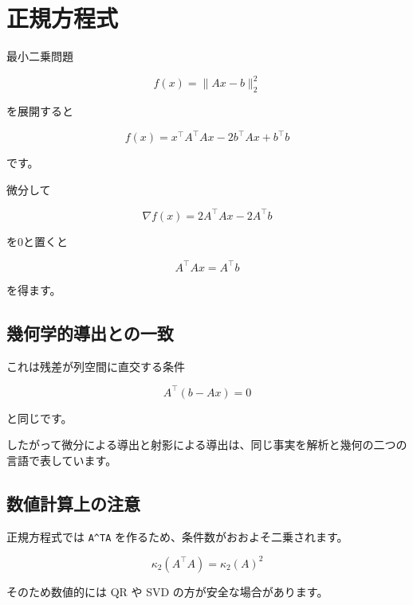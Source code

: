 \documentclass[
  11pt,
  a4paper,
]{ltjsarticle}
\author{}
\date{}
\begin{document}
\hypertarget{ux6b63ux898fux65b9ux7a0bux5f0f}{%
\section{正規方程式}\label{ux6b63ux898fux65b9ux7a0bux5f0f}}

最小二乗問題

\[
f(x)=\|Ax-b\|_2^2
\]

を展開すると

\[
f(x)=x^\top A^\top Ax-2b^\top Ax+b^\top b
\]

です。

微分して

\[
\nabla f(x)=2A^\top Ax-2A^\top b
\]

を0と置くと

\[
\boxed{A^\top Ax=A^\top b}
\]

を得ます。

\hypertarget{ux5e7eux4f55ux5b66ux7684ux5c0eux51faux3068ux306eux4e00ux81f4}{%
\subsection{幾何学的導出との一致}\label{ux5e7eux4f55ux5b66ux7684ux5c0eux51faux3068ux306eux4e00ux81f4}}

これは残差が列空間に直交する条件

\[
A^\top(b-Ax)=0
\]

と同じです。

したがって微分による導出と射影による導出は、同じ事実を解析と幾何の二つの言語で表しています。

\hypertarget{ux6570ux5024ux8a08ux7b97ux4e0aux306eux6ce8ux610f}{%
\subsection{数値計算上の注意}\label{ux6570ux5024ux8a08ux7b97ux4e0aux306eux6ce8ux610f}}

正規方程式では \texttt{A\^{}TA}
を作るため、条件数がおおよそ二乗されます。

\[
\kappa_2(A^\top A)=\kappa_2(A)^2
\]

そのため数値的には QR や SVD の方が安全な場合があります。
\end{document}
